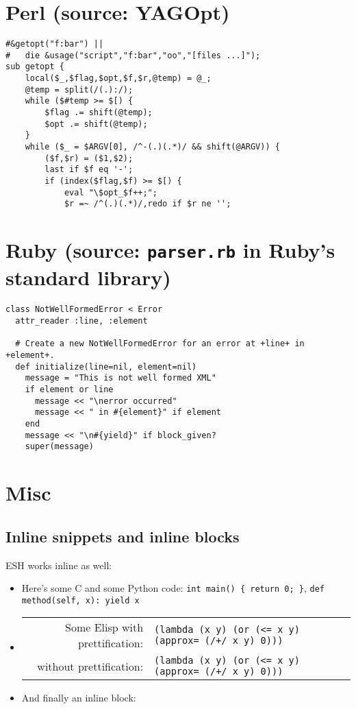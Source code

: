 \documentclass{article}
\def\cverb{\verb}
\def\pythonverb{\verb}
\def\prettylisp{\verb}
\def\normallisp{\verb}
\begin{document}
\clearpage

\section*{Perl (source: YAGOpt)}

\begin{verbatim}
#&getopt("f:bar") ||
#	die &usage("script","f:bar","oo","[files ...]");
sub getopt {
    local($_,$flag,$opt,$f,$r,@temp) = @_;
    @temp = split(/(.):/);
    while ($#temp >= $[) {
        $flag .= shift(@temp);
        $opt .= shift(@temp);
    }
    while ($_ = $ARGV[0], /^-(.)(.*)/ && shift(@ARGV)) {
        ($f,$r) = ($1,$2);
        last if $f eq '-';
        if (index($flag,$f) >= $[) {
            eval "\$opt_$f++;";
            $r =~ /^(.)(.*)/,redo if $r ne '';
\end{verbatim}

\section*{Ruby (source: \texttt{parser.rb} in Ruby's standard library)}

\begin{verbatim}
class NotWellFormedError < Error
  attr_reader :line, :element

  # Create a new NotWellFormedError for an error at +line+ in +element+.
  def initialize(line=nil, element=nil)
    message = "This is not well formed XML"
    if element or line
      message << "\nerror occurred"
      message << " in #{element}" if element
    end
    message << "\n#{yield}" if block_given?
    super(message)
\end{verbatim}

\section*{Misc}

\subsection*{Inline snippets and inline blocks}

ESH works inline as well:

\begin{itemize}
\item Here's some C and some Python code: \cverb|int main() { return 0; }|, \pythonverb/def method(self, x): yield x/
\item
  \begin{tabular}[t]{@{}r@{ }l}
    Some Elisp with prettification: & \prettylisp,(lambda (x y) (or (<= x y) (approx= (/+/ x y) 0))), \\
            without prettification: & \normallisp!(lambda (x y) (or (<= x y) (approx= (/+/ x y) 0)))!
  \end{tabular}
\item And finally an inline block: 
\end{itemize}
\end{document}

